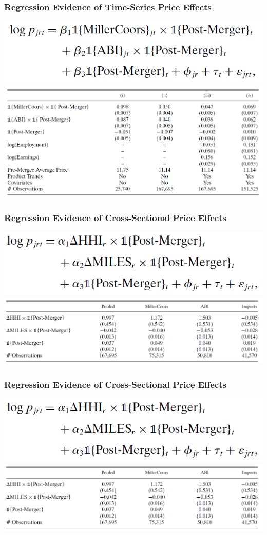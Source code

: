 \documentclass{beamer}
\begin{document}
\begin{frame}\frametitle{Regression Evidence of Time-Series Price Effects}
    \centering
    \includegraphics[width=0.5\linewidth]{eq_1} \\
    \vspace{2ex}
    \includegraphics[width=0.95\linewidth]{table_2}
\end{frame}

\begin{frame}\frametitle{Regression Evidence of Cross-Sectional Price Effects}
    \centering
    \includegraphics[width=0.5\linewidth]{eq_2} \\
    \vspace{2ex}
    \includegraphics[width=0.95\linewidth]{table_3}
\end{frame}

\begin{frame}\frametitle{Regression Evidence of Cross-Sectional Price Effects}
    \centering
    \includegraphics[width=0.5\linewidth]{eq_2} \\
    \vspace{2ex}
    \includegraphics[width=0.95\linewidth]{table_3}
\end{frame} 
\end{document}
